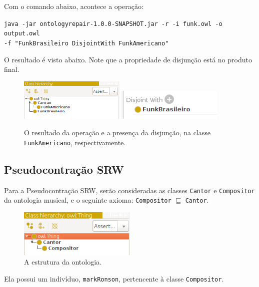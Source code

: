 Com o comando abaixo, acontece a operação:

\begin{small}
	\texttt{java -jar ontologyrepair-1.0.0-SNAPSHOT.jar -r -i funk.owl -o output.owl \\ -f "FunkBrasileiro DisjointWith FunkAmericano"}
\end{small}

O resultado é visto abaixo. Note que a propriedade de disjunção está no produto final.

\begin{figure}[H]
	\centering
	\includegraphics[width=0.45\textwidth]{Capitulos/Implementacao/r2.png}
	\includegraphics[width=0.45\textwidth]{Capitulos/Implementacao/r3.png}
	\caption{O resultado da operação e a presença da disjunção, na classe \texttt{FunkAmericano}, respectivamente.}
\end{figure}

\subsection{Pseudocontração SRW}

Para a Pseudocontração SRW, serão consideradas as classes \texttt{Cantor} e \texttt{Compositor} da ontologia musical, e o seguinte axioma: \texttt{Compositor} $ \sqsubseteq $ \texttt{Cantor}.

\begin{figure}[H]
	\centering
	\includegraphics[width=0.5\textwidth]{Capitulos/Implementacao/srw1.png}
	\caption{A estrutura da ontologia.}
\end{figure}

Ela possui um indivíduo, \texttt{markRonson}, pertencente à classe \texttt{Compositor}.


